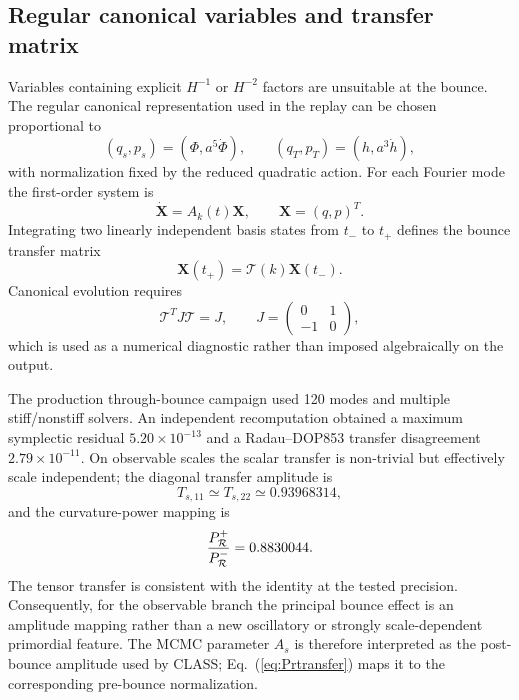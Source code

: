 \documentclass[12pt]{iopart}
\newcommand{\cT}{\mathcal T}
\begin{document}
\subsection{Regular canonical variables and transfer matrix}

Variables containing explicit $H^{-1}$ or $H^{-2}$ factors are unsuitable at the bounce.  The regular canonical representation used in the replay can be chosen proportional to
\begin{equation}
(q_s,p_s)=(\Phi,a^5\dot\Phi),\qquad
(q_T,p_T)=(h,a^3\dot h),
\label{eq:canonicalvars}
\end{equation}
with normalization fixed by the reduced quadratic action.  For each Fourier mode the first-order system is
\begin{equation}
\dot{\bm X}=A_k(t)\bm X,
\qquad \bm X=(q,p)^T.
\label{eq:firstorder}
\end{equation}
Integrating two linearly independent basis states from $t_-$ to $t_+$ defines the bounce transfer matrix
\begin{equation}
\bm X(t_+)=\cT(k)\bm X(t_-).
\end{equation}
Canonical evolution requires
\begin{equation}
\cT^T J\cT=J,\qquad
J=\left(\begin{array}{cc}0&1\\-1&0\end{array}\right),
\label{eq:symplectic}
\end{equation}
which is used as a numerical diagnostic rather than imposed algebraically on the output.

The production through-bounce campaign used 120 modes and multiple stiff/nonstiff solvers.  An independent recomputation obtained a maximum symplectic residual $5.20\times10^{-13}$ and a Radau--DOP853 transfer disagreement $2.79\times10^{-11}$.  On observable scales the scalar transfer is non-trivial but effectively scale independent; the diagonal transfer amplitude is
\begin{equation}
T_{s,11}\simeq T_{s,22}\simeq0.93968314,
\end{equation}
and the curvature-power mapping is
\begin{equation}
\frac{P_{\cal R}^{+}}{P_{\cal R}^{-}}=0.8830044.
\label{eq:Prtransfer}
\end{equation}
The tensor transfer is consistent with the identity at the tested precision.  Consequently, for the observable branch the principal bounce effect is an amplitude mapping rather than a new oscillatory or strongly scale-dependent primordial feature.  The MCMC parameter $A_s$ is therefore interpreted as the post-bounce amplitude used by CLASS; Eq.~(\ref{eq:Prtransfer}) maps it to the corresponding pre-bounce normalization.
\end{document}
